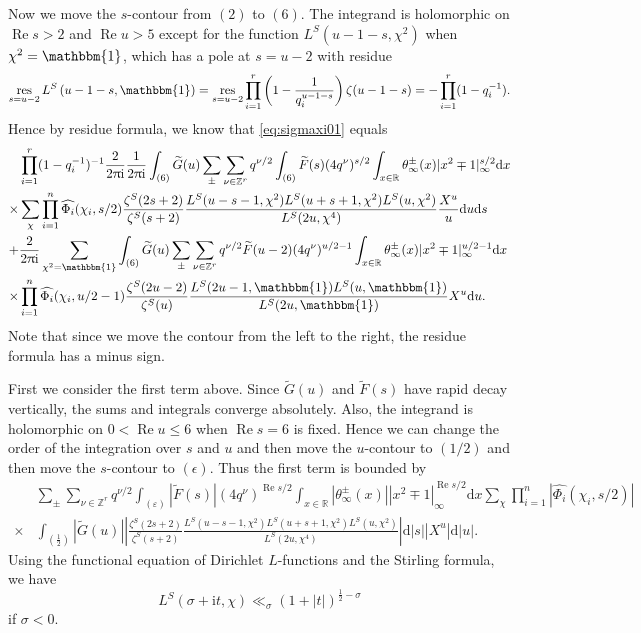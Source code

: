 \documentclass[10pt,oneside,reqno]{amsart}
\makeatletter
\newcommand\rmd{\mathrm{d}}
\newcommand\rmi{\mathrm{i}}
\newcommand\RR{\mathbb{R}}
\newcommand\ZZ{\mathbb{Z}}
\newcommand\triv{\mathbbm{1}}
\newcommand\dpii{2\uppi\rmi}
\renewcommand\Re{\mathop{\mathrm{Re}}}
\DeclareMathOperator\res{res}
\renewcommand\leq{\leqslant}
\theoremstyle{THEOREM}
\theoremstyle{DEFINITION}
\theoremstyle{EXERCISE}
\numberwithin{equation}{section}
\renewenvironment{proof}[1][\proofname]{\par
  \vspace{-6pt}
  \pushQED{\qed}
  \normalfont \topsep6\p@\@plus6\p@\relax
  \trivlist
  \item[\hskip\labelsep\rmfamily\bfseries
    #1\@addpunct{:}]\ignorespaces
}{
  \popQED\endtrivlist\@endpefalse
  \vspace{-6pt}
}
\makeatother
\begin{document}
\begin{proof}
Now we move the $s$-contour from $(2)$ to $(6)$. The integrand is holomorphic on $\Re s>2$ and $\Re u>5$ except for the function $L^S(u-1-s,\chi^2)$ when $\chi^2=\triv$, which has a pole at $s=u-2$ with residue
\[
\res_{s=u-2}L^S\left(u-1-s,\triv\right)=\res_{s=u-2}\prod_{i=1}^{r}\left(1-\frac{1}{q_i^{ u-1-s}}\right)\zeta(u-1-s)=-\prod_{i=1}^{r}(1-q_i^{-1}).
\]
Hence by residue formula, we know that \eqref{eq:sigmaxi01} equals
\begin{align*}
&\prod_{i=1}^{r}(1-q_i^{-1})^{-1}\frac{2}{\dpii}\frac{1}{\dpii} \int_{(6)}\widetilde{G}(u)\sum_{\pm}\sum_{\nu\in \ZZ^r}q^{\nu/2}\int_{(6)}\widetilde{F}(s)(4q^\nu)^{s/2}\int_{x\in\RR}\theta_\infty^\pm(x)|x^2\mp 1|_\infty^{s/2}\rmd x\\
  \times&\sum_{\chi}\prod_{i=1}^{n}\widehat{\Phi_i}(\chi_i, s/2)\frac{\zeta^S(2s+2)}{\zeta^S(s+2)} \frac{L^S(u-s-1,\chi^2)L^S(u+s+1,\chi^2)L^S(u,\chi^2)}{L^S(2u,\chi^4)}\frac{X^u}{u}\rmd u\rmd s\\
  +&\frac{2}{\dpii}\sum_{\chi^2=\triv}\int_{(6)}\widetilde{G}(u)\sum_{\pm}\sum_{\nu\in \ZZ^r}q^{\nu/2}\widetilde{F}(u-2)(4q^\nu)^{u/2-1} \int_{x\in\RR}\theta_\infty^\pm(x)|x^2\mp 1|_\infty^{u/2-1}\rmd x\\
  \times&\prod_{i=1}^{n}\widehat{\Phi_i}(\chi_i,u/2-1)\frac{\zeta^S(2u-2)}{\zeta^S(u)} \frac{L^S(2u-1,\triv)L^S(u,\triv)}{L^S(2u,\triv)} X^u\rmd u.
\end{align*}
Note that since we move the contour from the left to the right, the residue formula has a minus sign.

First we consider the first term above. Since $\widetilde{G}(u)$ and $\widetilde{F}(s)$ have rapid decay vertically, the sums and integrals converge absolutely. Also, the integrand is holomorphic on $0<\Re u\leq 6$ when $\Re s=6$ is fixed. Hence we can change the order of the integration over $s$ and $u$ and then move the $u$-contour to $(1/2)$ and then move the $s$-contour to $(\epsilon)$. Thus the first term is bounded by
\begin{align*}
&\sum_{\pm}\sum_{\nu\in \ZZ^r}q^{\nu/2}\int_{(\varepsilon)}|\widetilde{F}(s)|(4q^\nu)^{\Re s/2}\int_{x\in\RR}|\theta_\infty^\pm(x)||x^2\mp 1|_\infty^{\Re s/2}\rmd x\sum_{\chi}\prod_{i=1}^{n}|\widehat{\Phi_i}(\chi_i,s/2)|\\
  \times&\int_{(\frac12)}|\widetilde{G}(u)|\left|\frac{\zeta^S(2s+2)}{\zeta^S(s+2)} \frac{L^S(u-s-1,\chi^2)L^S(u+s+1,\chi^2)L^S(u,\chi^2)}{L^S(2u,\chi^4)}\right|\rmd |s||X^u|\rmd |u|.
\end{align*}
Using the functional equation of Dirichlet $L$-functions and the Stirling formula, we have
\begin{equation}\label{eq:boundlvertical}
L^S(\sigma+\rmi t,\chi)\ll_\sigma (1+|t|)^{\frac12-\sigma}
\end{equation}
if $\sigma<0$.


\end{proof}
\end{document}

